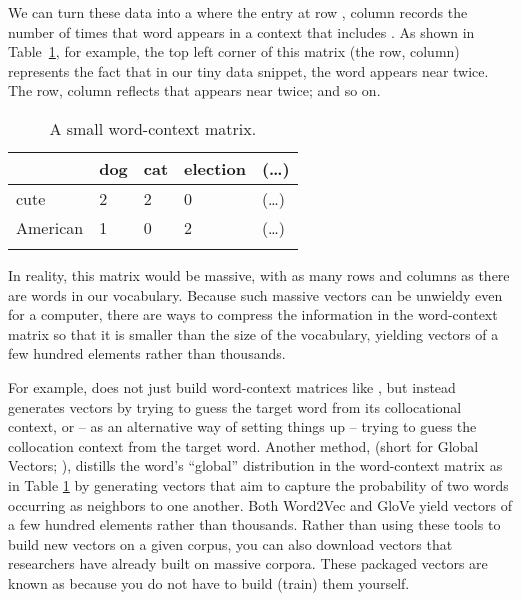 We can turn these data into a  where the
entry at row , column  records the number of times
that word  appears in a context that includes .
As shown in Table~\ref{tab:word-context-matrix}, for example, the top
left corner of this matrix (the  row, 
column) represents the fact that in our tiny data snippet, the word
 appears near  twice.  The  row,
 column reflects that  appears near
 twice; and so on.

\begin{table}
\begin{tabular}{l  l  l  l  l}
\lsptoprule
    & dog & cat & election  & (\ldots) \\ \midrule
cute & 2 & 2 & 0 & (\ldots) \\
American & 1 & 0 & 2  & (\ldots) \\
\lspbottomrule
\end{tabular}
\caption{A small word-context matrix.}
\label{tab:word-context-matrix}
\end{table}

In reality, this matrix would be massive, with as many rows and
columns as there are words in our vocabulary. Because such massive
vectors can be unwieldy even for a computer, there are ways to
compress the information in the word-context matrix so that it is
smaller than the size of the vocabulary, yielding vectors of a few
hundred elements rather than thousands.  

For example,  \citep{Mikolov-etal:2013} does not just build word-context matrices like  , but instead generates vectors by trying to guess the target word from its collocational context, or -- as an alternative way of setting things up -- trying to guess the collocation context from the target word.  Another method,  (short for Global Vectors; \citealt{Pennington-etal:2014}), distills the word's ``global'' distribution in the word-context matrix as in Table  \ref{tab:word-context-matrix} by generating vectors that aim to capture the probability of two words occurring as neighbors to one another.  Both Word2Vec and GloVe yield vectors of a few hundred elements rather than thousands.  Rather than using these tools to build new vectors on a given corpus, you can also download vectors that researchers have already built on massive corpora.  These packaged vectors are known as  because you do not have to build (train) them yourself.


